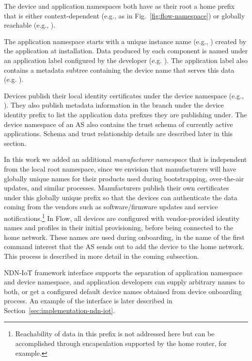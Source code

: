 The device and application namespaces both have as their root a home prefix that is either context-dependent (e.g.,  as in Fig.~\ref{fig:flow-namespace}) or globally reachable (e.g., ).

The application namespace starts with a unique instance name (e.g., ) created by the application at installation. 
Data produced by each component is named under an application label configured by the developer (e.g. ). 
The application label also contains a metadata subtree containing the device name that serves this data (e.g. ).

Devices publish their local identity certificates under the device namespace (e.g., ).
They also publish metadata information in the  branch under the device identity prefix to list the application data prefixes they are publishing under. 
The device namespace of an AS also contains the trust schema of currently active applications. 
Schema and trust relationship details are described later in this section.

In this work we added an additional \textit{manufacturer namespace} that is independent from the local root namespace, since we envision that manufacturers will have globally unique names for their products used during bootstrapping, over-the-air updates, and similar processes. 
Manufacturers publish their own certificates under this globally unique prefix so that the devices can authenticate the data coming from the vendors such as software/firmware updates and service notifications.\footnote{Reachability of data in this prefix is not addressed here but can be accomplished through encapsulation supported by the home router, for example.}
In Flow, all devices are configured with vendor-provided identity names and profiles in their initial provisioning, before being connected to the home network.
These names are used during onboarding, in the name of the first command interest that the AS sends out to add the device to the home network.
This process is described in more detail in the coming subsection.

NDN-IoT framework interface supports the separation of application namespace and device namespace, and application developers can supply arbitrary names to both, or get a configured default device names obtained from device onboarding process. 
An example of the interface is later described in Section~\ref{sec:implementation-ndn-iot}.

